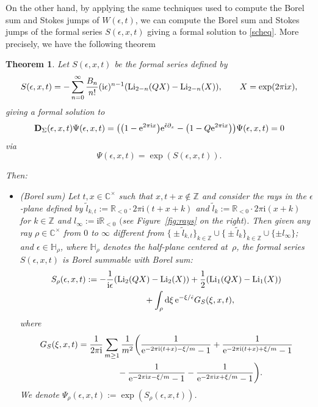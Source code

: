 \documentclass[pdftex]{sigma}
\numberwithin{equation}{section}
\newtheorem{Theorem}{Theorem}[section]
\begin{document}
On the other hand, by applying the same techniques used to compute the Borel sum and Stokes jumps of $W(\epsilon,t)$, we can compute the Borel sum and Stokes jumps of the formal series $S(\epsilon,x,t)$ giving a formal solution to \eqref{scheq}. More precisely, we have the following theorem

\begin{Theorem}\label{th:BorelS}
Let $S(\epsilon,x,t)$ be the formal series defined by
\begin{equation*}
 S(\epsilon,x,t)= - \sum_{n=0}^{\infty} \frac{B_n}{n!} (\mathrm{i}\epsilon)^{n-1} ( {\rm Li}_{2-n}(Q X)-{\rm Li}_{2-n}(X) ), \qquad X=\exp(2\pi \mathrm{i} x),
\end{equation*}
giving a formal solution to
\begin{equation*}
 \mathbf{D}_\Sigma (\epsilon,x,t) \Psi(\epsilon,x,t)= \big(\big(1-{\rm e}^{2 \pi \mathrm{i} x}\big) {\rm e}^{\check{\epsilon} \partial_x} - \big(1 - Q {\rm e}^{2 \pi \mathrm{i} x}\big)\big)\Psi(\epsilon,x,t)=0
\end{equation*}
via
\begin{equation*}
\Psi(\epsilon,x,t)= \exp ( S(\epsilon,x,t)).
\end{equation*}

Then:
\begin{itemize}\itemsep=0pt
 \item {\rm (Borel sum)} Let $t,x\in \mathbb{C}^{\times}$ such that $x, t+x \notin \mathbb{Z}$ and consider the rays in the $\epsilon$-plane defined by $\widetilde{l}_{k,t}:=\mathbb{R}_{<0}\cdot 2\pi \mathrm{i} (t+x+k)$ and $\widetilde{l}_{k}:=\mathbb{R}_{<0}\cdot 2\pi \mathrm{i} (x+k)$ for $k\in \mathbb{Z}$ and $l_{\infty}:=\mathrm{i}\mathbb{R}_{<0}$ $($see Figure~{\rm \ref{fig:rays}} on the right$)$. Then given any ray $\rho \in \mathbb{C}^{\times}$ from $0$ to $\infty$ different from $\big\{\pm \widetilde{l}_{k,t}\big\}_{k\in \mathbb{Z}}\cup\big\{\pm \widetilde{l}_k\big\}_{k\in \mathbb{Z}}\cup \{\pm l_{\infty}\}$; and $\epsilon \in \mathbb{H}_{\rho}$, where $\mathbb{H}_{\rho}$ denotes the half-plane centered at~$\rho$, the formal series $S(\epsilon,x,t)$ is Borel summable with Borel sum:
 \begin{gather*}%
 S_{\rho}(\epsilon,x,t) := -\frac{1}{\mathrm{i}\epsilon} (\mathrm{Li}_{2}(QX)-\mathrm{Li}_{2}(X) )+ \frac{1}{2} (\mathrm{Li}_{1}(QX)-\mathrm{Li}_{1}(X) ) \nonumber\\
\hphantom{S_{\rho}(\epsilon,x,t) :=}{} + \int_{\rho}\mathrm{d}\xi\, {\rm e}^{-\xi/\check{\epsilon}}G_S(\xi,x,t),
 \end{gather*}
 where
 \begin{gather*}
 G_S(\xi,x,t)
 =\frac{1}{2\pi \mathrm{i}}\sum_{m\geq 1}\frac{1}{m^2}\bigg( \frac{1}{{\rm e}^{-2\pi \mathrm{i}(t+x)-\xi/m}-1}+\frac{1}{{\rm e}^{-2\pi \mathrm{i}(t+x)+\xi/m}-1} \nonumber\\
\hphantom{G_S(\xi,x,t)=}{}
-\frac{1}{{\rm e}^{-2\pi \mathrm{i} x-\xi/m}-1}-\frac{1}{{\rm e}^{-2\pi \mathrm{i} x+\xi/m}-1}\bigg).
 \end{gather*}
 We denote $\Psi_{\rho}(\epsilon,x,t):=\exp(S_{\rho}(\epsilon,x,t))$.


\end{itemize}
\end{Theorem}
\end{document}
